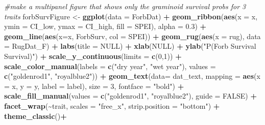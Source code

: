 \documentclass[
]{article}
\newenvironment{Shaded}{\begin{snugshade}}{\end{snugshade}}
\newcommand{\CommentTok}[1]{\textcolor[rgb]{0.56,0.35,0.01}{\textit{#1}}}
\newcommand{\DataTypeTok}[1]{\textcolor[rgb]{0.13,0.29,0.53}{#1}}
\newcommand{\DecValTok}[1]{\textcolor[rgb]{0.00,0.00,0.81}{#1}}
\newcommand{\FloatTok}[1]{\textcolor[rgb]{0.00,0.00,0.81}{#1}}
\newcommand{\KeywordTok}[1]{\textcolor[rgb]{0.13,0.29,0.53}{\textbf{#1}}}
\newcommand{\NormalTok}[1]{#1}
\newcommand{\OperatorTok}[1]{\textcolor[rgb]{0.81,0.36,0.00}{\textbf{#1}}}
\newcommand{\OtherTok}[1]{\textcolor[rgb]{0.56,0.35,0.01}{#1}}
\newcommand{\StringTok}[1]{\textcolor[rgb]{0.31,0.60,0.02}{#1}}
\begin{document}
\begin{Shaded}
\begin{Highlighting}[]
\CommentTok{\#make a multipanel figure that shows only the graminoid survival probs for 3 traits}
\NormalTok{forbSurvFigure \textless{}{-}}\StringTok{ }\KeywordTok{ggplot}\NormalTok{(}\DataTypeTok{data =}\NormalTok{ ForbDat) }\OperatorTok{+}
\StringTok{  }\KeywordTok{geom\_ribbon}\NormalTok{(}\KeywordTok{aes}\NormalTok{(}\DataTypeTok{x =}\NormalTok{ x, }\DataTypeTok{ymin =}\NormalTok{ CI\_low, }\DataTypeTok{ymax =}\NormalTok{ CI\_high, }\DataTypeTok{fill =}\NormalTok{ SPEI), }\DataTypeTok{alpha =} \FloatTok{0.3}\NormalTok{) }\OperatorTok{+}
\StringTok{  }\KeywordTok{geom\_line}\NormalTok{(}\KeywordTok{aes}\NormalTok{(}\DataTypeTok{x=}\NormalTok{x, ForbSurv, }\DataTypeTok{col =}\NormalTok{ SPEI))  }\OperatorTok{+}\StringTok{ }
\StringTok{  }\KeywordTok{geom\_rug}\NormalTok{(}\KeywordTok{aes}\NormalTok{(}\DataTypeTok{x =}\NormalTok{ rug), }\DataTypeTok{data =}\NormalTok{ RugDat\_F) }\OperatorTok{+}
\StringTok{  }\KeywordTok{labs}\NormalTok{(}\DataTypeTok{title =} \OtherTok{NULL}\NormalTok{) }\OperatorTok{+}
\StringTok{  }\KeywordTok{xlab}\NormalTok{(}\OtherTok{NULL}\NormalTok{) }\OperatorTok{+}
\StringTok{  }\KeywordTok{ylab}\NormalTok{(}\StringTok{"P(Forb Survival Survival)"}\NormalTok{) }\OperatorTok{+}
\StringTok{  }\KeywordTok{scale\_y\_continuous}\NormalTok{(}\DataTypeTok{limits =} \KeywordTok{c}\NormalTok{(}\DecValTok{0}\NormalTok{,}\DecValTok{1}\NormalTok{)) }\OperatorTok{+}
\StringTok{  }\KeywordTok{scale\_color\_manual}\NormalTok{(}\DataTypeTok{labels =} \KeywordTok{c}\NormalTok{(}\StringTok{"dry year"}\NormalTok{, }\StringTok{"wet year"}\NormalTok{), }\DataTypeTok{values =} \KeywordTok{c}\NormalTok{(}\StringTok{"goldenrod1"}\NormalTok{, }\StringTok{"royalblue2"}\NormalTok{)) }\OperatorTok{+}
\StringTok{  }\KeywordTok{geom\_text}\NormalTok{(}\DataTypeTok{data=}\NormalTok{ dat\_text, }\DataTypeTok{mapping =} \KeywordTok{aes}\NormalTok{(}\DataTypeTok{x =}\NormalTok{ x, }\DataTypeTok{y =}\NormalTok{ y, }\DataTypeTok{label =}\NormalTok{ label), }\DataTypeTok{size =} \DecValTok{3}\NormalTok{, }\DataTypeTok{fontface =} \StringTok{"bold"}\NormalTok{) }\OperatorTok{+}
\StringTok{  }\KeywordTok{scale\_fill\_manual}\NormalTok{(}\DataTypeTok{values =} \KeywordTok{c}\NormalTok{(}\StringTok{"goldenrod1"}\NormalTok{, }\StringTok{"royalblue2"}\NormalTok{), }\DataTypeTok{guide =} \OtherTok{FALSE}\NormalTok{) }\OperatorTok{+}
\StringTok{  }\KeywordTok{facet\_wrap}\NormalTok{(}\OperatorTok{\textasciitilde{}}\NormalTok{trait, }\DataTypeTok{scales =} \StringTok{"free\_x"}\NormalTok{, }\DataTypeTok{strip.position =}  \StringTok{"bottom"}\NormalTok{) }\OperatorTok{+}
\StringTok{  }\KeywordTok{theme\_classic}\NormalTok{()}\OperatorTok{+}

\end{Highlighting}
\end{Shaded}
\end{document}
